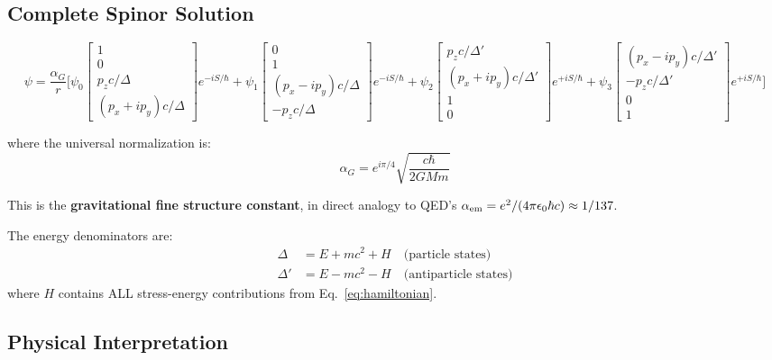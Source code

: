 \documentclass[11pt,a4paper]{article}
\theoremstyle{definition}
\theoremstyle{remark}
\begin{document}
	\subsection{Complete Spinor Solution}
	
	\begin{equation}
		\psi = \frac{\alpha_G}{r}\Bigg[
		\psi_0\begin{bmatrix}1\\0\\ p_zc/\Delta\\ (p_x+ip_y)c/\Delta\end{bmatrix}e^{-iS/\hbar}
		+\psi_1\begin{bmatrix}0\\1\\ (p_x-ip_y)c/\Delta\\ -p_zc/\Delta\end{bmatrix}e^{-iS/\hbar}
		+\psi_2\begin{bmatrix}p_zc/\Delta'\\ (p_x+ip_y)c/\Delta'\\1\\0\end{bmatrix}e^{+iS/\hbar}
		+\psi_3\begin{bmatrix}(p_x-ip_y)c/\Delta'\\ -p_zc/\Delta'\\0\\1\end{bmatrix}e^{+iS/\hbar}
		\Bigg]
		\label{eq:four_component_wavefunction}
	\end{equation}
	
	where the universal normalization is:
	\begin{equation}
		\boxed{\alpha_G = e^{i\pi/4}\sqrt{\frac{c\hbar}{2GMm}}}
		\label{eq:universal_alphaG}
	\end{equation}
	
	This is the \textbf{gravitational fine structure constant}, in direct analogy to QED's $\alpha_{\rm em}=e^2/(4\pi\epsilon_0\hbar c)\approx 1/137$.
	
	The energy denominators are:
	\begin{align}
		\Delta  &= E + mc^2 + H \quad\text{(particle states)} \\
		\Delta' &= E - mc^2 - H \quad\text{(antiparticle states)}
	\end{align}
	where $H$ contains ALL stress-energy contributions from Eq.~\eqref{eq:hamiltonian}.
	
	\subsection{Physical Interpretation}
	
\end{document}
